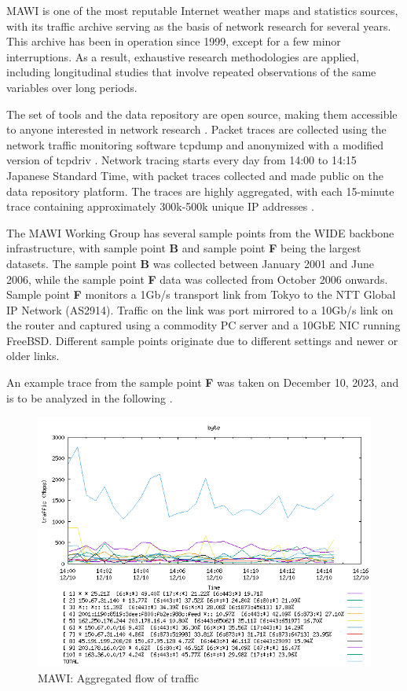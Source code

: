 \documentclass[sigconf,authorversion,nonacm]{acmart}
\begin{document}
MAWI is one of the most reputable Internet weather maps and statistics sources, with its traffic archive serving as the basis of network research for several years. This archive has been in operation since 1999, except for a few minor interruptions. As a result, exhaustive research methodologies are applied, including longitudinal studies that involve repeated observations of the same variables over long periods.

The set of tools and the data repository are open source, making them accessible to anyone interested in network research \cite{MAWIDataset}. Packet traces are collected using the network traffic monitoring software tcpdump \cite{tcpdump} and anonymized with a modified version of tcpdriv \cite{TCPDPRIV}. Network tracing starts every day from 14:00 to 14:15 Japanese Standard Time, with packet traces collected and made public on the data repository platform. The traces are highly aggregated, with each 15-minute trace containing approximately 300k-500k unique IP addresses \cite{5061979}.

The MAWI Working Group has several sample points from the WIDE backbone infrastructure, with sample point \textbf{B} and sample point \textbf{F} being the largest datasets. The sample point \textbf{B} was collected between January 2001 and June 2006, while the sample point \textbf{F} data was collected from October 2006 onwards. Sample point \textbf{F} monitors a 1Gb/s transport link from Tokyo to the NTT Global IP Network (AS2914). Traffic on the link was port mirrored to a 10Gb/s link on the router and captured using a commodity PC server and a 10GbE NIC running FreeBSD. Different sample points originate due to different settings and newer or older links.

An example trace from the sample point \textbf{F} was taken on December 10, 2023, and is to be analyzed in the following \cite{traceMAWI}.

\begin{figure}
        \centering
        \includegraphics[width=1\linewidth]{MAWI/MAWI 2023-12-10 aggregated analysis byte.png}
        \caption{MAWI: Aggregated flow of traffic}
        \label{MAWI: Aggregated Flow Byte}
\end{figure}
\end{document}
